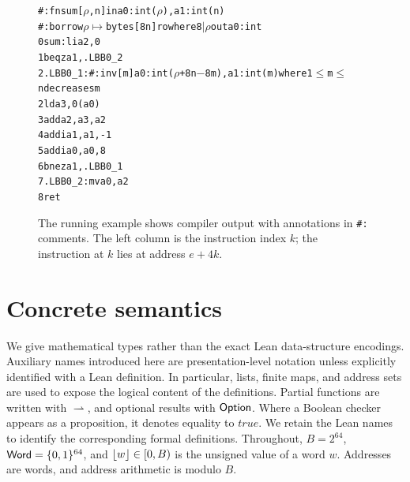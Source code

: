 \begin{figure}[t]
\begin{alltt}\small
#: fn sum [\(\rho\), n]  in a0: int(\(\rho\)), a1: int(n)
#:   borrow \(\rho\) \(\mapsto\) bytes[8n] ro   where 8 \(\mid\) \(\rho\)   out a0: int
0  sum:    li   a2, 0
1          beqz a1, .LBB0_2
2  .LBB0_1:  #: inv [m] a0: int(\(\rho\)+8n\(-\)8m), a1: int(m) where 1\(\le\)m\(\le\)n decreases m
2          ld   a3, 0(a0)
3          add  a2, a3, a2
4          addi a1, a1, -1
5          addi a0, a0, 8
6          bnez a1, .LBB0_1
7  .LBB0_2:  mv   a0, a2
8          ret
\end{alltt}
\vspace{-4pt}
\caption{The running example shows compiler output with annotations in \texttt{\#:} comments. The left column is the instruction index $k$; the instruction at $k$ lies at address $e+4k$.}
\label{fig:sum}
\end{figure}

\section{Concrete semantics}\label{sec:concrete}
We give mathematical types rather than the exact Lean data-structure encodings. Auxiliary names introduced here are presentation-level notation unless explicitly identified with a Lean definition. In particular, lists, finite maps, and address sets are used to expose the logical content of the definitions. Partial functions are written with $\rightharpoonup$, and optional results with $\mathsf{Option}$. Where a Boolean checker appears as a proposition, it denotes equality to $\mathit{true}$. We retain the Lean names to identify the corresponding formal definitions.
Throughout, $B=2^{64}$, $\mathsf{Word}=\{0,1\}^{64}$, and $\lfloor w\rfloor\in[0,B)$ is the unsigned value of a word $w$. Addresses are words, and address arithmetic is modulo $B$.

